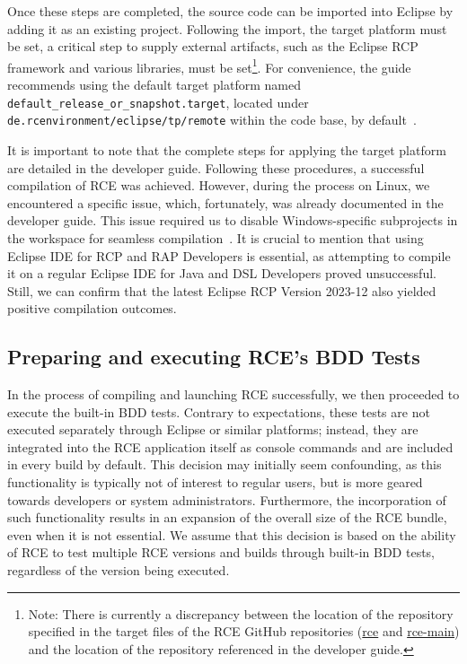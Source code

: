 Once these steps are completed, the source code can be imported into Eclipse by adding it as an existing project. Following the import, the target platform must be set, a critical step to supply external artifacts, such as the Eclipse RCP framework and various libraries, must be set\footnote{Note: There is currently a discrepancy between the location of the repository specified in the target files of the RCE GitHub repositories (\href{https://github.com/rcenvironment/rce/blob/master/de.rcenvironment/eclipse/tp/remote/default_release_or_snapshot.target}{rce} and \href{https://github.com/rcenvironment/rce-main/blob/main/de.rcenvironment/eclipse/tp/remote/default_release_or_snapshot.target}{rce-main}) and the location of the repository referenced in the developer guide.}. For convenience, the guide recommends using the default target platform named \texttt{default\_release\_or\_snapshot.target}, located under \texttt{de.rcenvironment/eclipse/tp/remote} within the code base, by default~\cite{rceDevGuide10x}.

It is important to note that the complete steps for applying the target platform are detailed in the developer guide. Following these procedures, a successful compilation of \ac{RCE} was achieved. However, during the process on Linux, we encountered a specific issue, which, fortunately, was already documented in the developer guide. This issue required us to disable Windows-specific subprojects in the workspace for seamless compilation~\cite{rceDevGuide10x}. It is crucial to mention that using Eclipse IDE for RCP and RAP Developers is essential, as attempting to compile it on a regular Eclipse IDE for Java and DSL Developers proved unsuccessful. Still, we can confirm that the latest Eclipse RCP Version 2023-12 also yielded positive compilation outcomes.

\subsection{Preparing and executing \ac{RCE}'s BDD Tests}
\label{subsec:PreparingRCETests}
In the process of compiling and launching \ac{RCE} successfully, we then proceeded to execute the built-in BDD tests. Contrary to expectations, these tests are not executed separately through Eclipse or similar platforms; instead, they are integrated into the \ac{RCE} application itself as console commands and are included in every build by default. This decision may initially seem confounding, as this functionality is typically not of interest to regular users, but is more geared towards developers or system administrators. Furthermore, the incorporation of such functionality results in an expansion of the overall size of the \ac{RCE} bundle, even when it is not essential. We assume that this decision is based on the ability of \ac{RCE} to test multiple \ac{RCE} versions and builds through built-in BDD tests, regardless of the version being executed.

